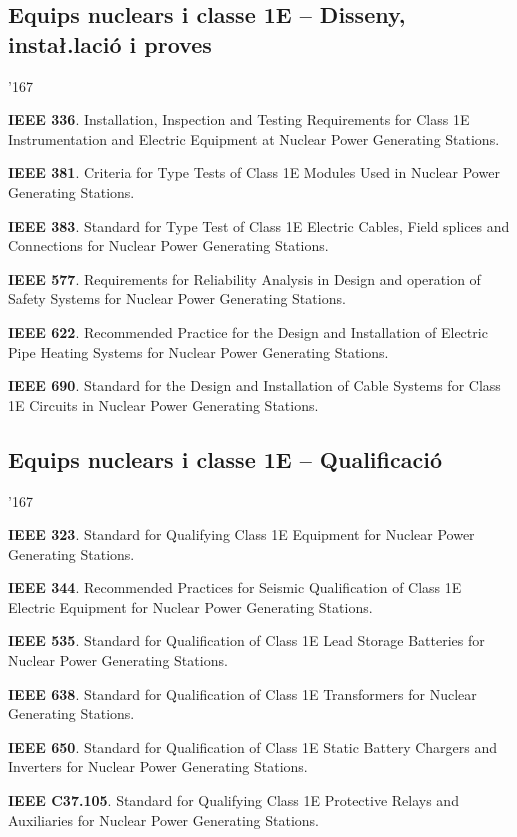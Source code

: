\subsection*{Equips nuclears i classe 1E -- Disseny, insta{\l.l}aci\'{o} i proves}
\begin{dinglist}{'167}
    \item \textbf{IEEE 336}. Installation, Inspection and Testing Requirements for Class 1E Instrumentation and Electric Equipment at Nuclear Power Generating Stations.
     \item \textbf{IEEE 381}. Criteria for Type Tests of Class 1E Modules Used in Nuclear Power Generating Stations.
    \item \textbf{IEEE 383}. Standard for Type Test of Class 1E Electric Cables, Field splices and Connections for Nuclear Power Generating Stations.
    \item \textbf{IEEE 577}. Requirements for Reliability Analysis in Design and operation of Safety Systems for Nuclear Power Generating Stations.
    \item \textbf{IEEE 622}. Recommended Practice for the Design and Installation of Electric Pipe Heating Systems for Nuclear Power Generating Stations.
    \item \textbf{IEEE 690}. Standard for the Design and Installation of Cable Systems for Class 1E Circuits in Nuclear Power Generating Stations.
\end{dinglist}


\subsection*{Equips nuclears i classe 1E -- Qualificaci\'{o}}
\begin{dinglist}{'167}
    \item \textbf{IEEE 323}. Standard for Qualifying Class 1E Equipment for Nuclear Power Generating Stations.
    \item \textbf{IEEE 344}. Recommended Practices for Seismic Qualification of Class 1E Electric Equipment for Nuclear Power Generating Stations.
    \item \textbf{IEEE 535}.  Standard for Qualification of Class 1E Lead Storage Batteries for Nuclear Power Generating Stations. 
    \item \textbf{IEEE 638}. Standard for Qualification of Class 1E Transformers for Nuclear Generating Stations.
    \item \textbf{IEEE 650}. Standard for Qualification of Class 1E Static Battery Chargers and Inverters for Nuclear Power Generating Stations.
    \item \textbf{IEEE C37.105}. Standard for Qualifying Class 1E Protective Relays and Auxiliaries for Nuclear Power Generating Stations.
\end{dinglist}


